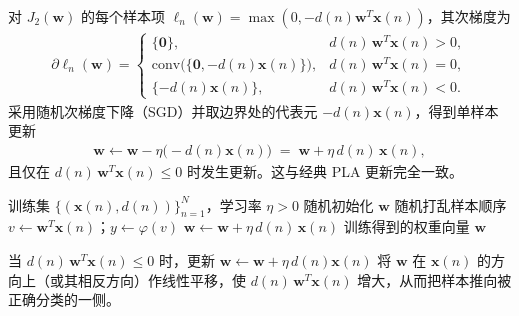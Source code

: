 
\begin{proposition}[次梯度与更新规则的推导]
对 $J_2(\boldsymbol{w})$ 的每个样本项 $\ell_n(\boldsymbol{w})=\max(0,-d(n)\boldsymbol{w}^T\boldsymbol{x}(n))$，其次梯度为
\begin{align}
\partial \ell_n(\boldsymbol{w}) =
\begin{cases}
\{\boldsymbol{0}\}, & d(n)\,\boldsymbol{w}^T\boldsymbol{x}(n) > 0,\\
\text{conv}\big(\{\boldsymbol{0},-d(n)\boldsymbol{x}(n)\}\big), & d(n)\,\boldsymbol{w}^T\boldsymbol{x}(n) = 0,\\
\{-d(n)\boldsymbol{x}(n)\}, & d(n)\,\boldsymbol{w}^T\boldsymbol{x}(n) < 0.
\end{cases}
\end{align}
采用随机次梯度下降（SGD）并取边界处的代表元 $-d(n)\boldsymbol{x}(n)$，得到单样本更新
\begin{align}
\boldsymbol{w}\leftarrow \boldsymbol{w} - \eta \big(-d(n)\boldsymbol{x}(n)\big)
\;=\;
\boldsymbol{w} + \eta\, d(n)\,\boldsymbol{x}(n),
\end{align}
且仅在 $d(n)\,\boldsymbol{w}^T\boldsymbol{x}(n)\le 0$ 时发生更新。这与经典 PLA 更新完全一致。
\end{proposition}

\begin{algorithm}
\caption{感知机学习算法（随机次梯度/PLA 形式）}
\begin{algorithmic}[1]
\Require 训练集 $\{(\boldsymbol{x}(n), d(n))\}_{n=1}^N$，学习率 $\eta>0$
\State 随机初始化 $\boldsymbol{w}$
\Repeat
  \State 随机打乱样本顺序
    \State $v\leftarrow \boldsymbol{w}^T\boldsymbol{x}(n)$；$y\leftarrow \varphi(v)$
     
       \State $\boldsymbol{w}\leftarrow \boldsymbol{w}+\eta\,d(n)\,\boldsymbol{x}(n)$
    \EndIf
  \EndFor
{}
\Ensure 训练得到的权重向量 $\boldsymbol{w}$
\end{algorithmic}
\end{algorithm}

\begin{derivationnote}[权重更新规则的几何解释]
当 $d(n)\, \boldsymbol{w}^T\boldsymbol{x}(n)\le 0$ 时，更新 $\boldsymbol{w}\leftarrow \boldsymbol{w}+\eta\,d(n)\boldsymbol{x}(n)$ 将
$\boldsymbol{w}$ 在 $\boldsymbol{x}(n)$ 的方向上（或其相反方向）作线性平移，使 $d(n)\,\boldsymbol{w}^T\boldsymbol{x}(n)$ 增大，从而把样本推向被正确分类的一侧。
\end{derivationnote}


